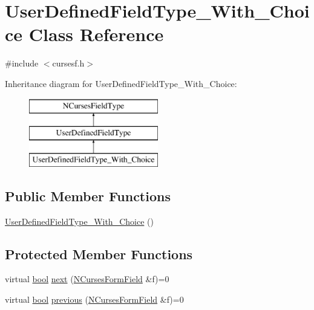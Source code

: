 \hypertarget{class_user_defined_field_type___with___choice}{\section{User\-Defined\-Field\-Type\-\_\-\-With\-\_\-\-Choice Class Reference}
\label{class_user_defined_field_type___with___choice}
}


{\ttfamily \#include $<$cursesf.\-h$>$}

Inheritance diagram for User\-Defined\-Field\-Type\-\_\-\-With\-\_\-\-Choice\-:\begin{figure}[H]
\begin{center}
\leavevmode
\includegraphics[height=3.000000cm]{class_user_defined_field_type___with___choice}
\end{center}
\end{figure}
\subsection*{Public Member Functions}
\begin{DoxyCompactItemize}
\item 
\hyperlink{class_user_defined_field_type___with___choice_acd4556e697975996ccd9964b4dcb9ed6}{User\-Defined\-Field\-Type\-\_\-\-With\-\_\-\-Choice} ()
\end{DoxyCompactItemize}
\subsection*{Protected Member Functions}
\begin{DoxyCompactItemize}
\item 
virtual \hyperlink{term__entry_8h_a002004ba5d663f149f6c38064926abac}{bool} \hyperlink{class_user_defined_field_type___with___choice_a22145aa6963594ae8f5e9e1f703e61e8}{next} (\hyperlink{class_n_curses_form_field}{N\-Curses\-Form\-Field} \&f)=0
\item 
virtual \hyperlink{term__entry_8h_a002004ba5d663f149f6c38064926abac}{bool} \hyperlink{class_user_defined_field_type___with___choice_a2a3028d88941f697e236cb2d49fbfc96}{previous} (\hyperlink{class_n_curses_form_field}{N\-Curses\-Form\-Field} \&f)=0
\end{DoxyCompactItemize}
